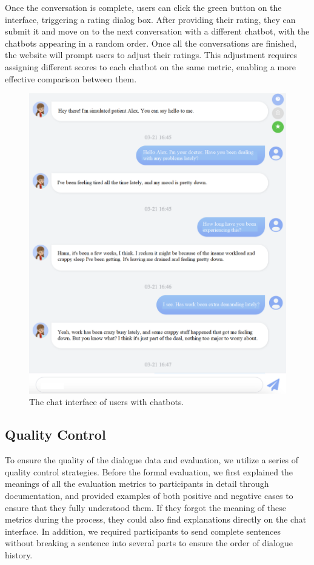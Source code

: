 Once the conversation is complete, users can click the green button on the interface, triggering a rating dialog box. After providing their rating, they can submit it and move on to the next conversation with a different chatbot, with the chatbots appearing in a random order. Once all the conversations are finished, the website will prompt users to adjust their ratings. This adjustment requires assigning different scores to each chatbot on the same metric, enabling a more effective comparison between them.
\begin{figure}[th]
	\centering
	\includegraphics[width=0.9\linewidth]{Figures/chat_interface.png}
	\caption{The chat interface of users with chatbots.}
	\label{fig:chat_inter}
\end{figure}

\subsection{Quality Control}
\label{apd:quality}
To ensure the quality of the dialogue data and evaluation, we utilize a series of quality control strategies.
Before the formal evaluation, we first explained the meanings of all the evaluation metrics to participants in detail through documentation, and provided examples of both positive and negative cases to ensure that they fully understood them. 
If they forgot the meaning of these metrics during the process, they could also find explanations directly on the chat interface. 
In addition, we required participants to send complete sentences without breaking a sentence into several parts to ensure the order of dialogue history.

